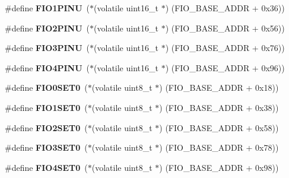 \begin{DoxyCompactItemize}
\#define {\bfseries F\+I\+O1\+P\+I\+NU}~($\ast$(volatile uint16\+\_\+t $\ast$) (F\+I\+O\+\_\+\+B\+A\+S\+E\+\_\+\+A\+D\+DR + 0x36))
\item 
\mbox{\label{group__lpc24xx__regs_ga17b04e8eb448c0cbe2640ce4be2178e2}} 
\#define {\bfseries F\+I\+O2\+P\+I\+NU}~($\ast$(volatile uint16\+\_\+t $\ast$) (F\+I\+O\+\_\+\+B\+A\+S\+E\+\_\+\+A\+D\+DR + 0x56))
\item 
\mbox{\label{group__lpc24xx__regs_ga3285eb90bb2c9c421ef5ced4ec9d0b8c}} 
\#define {\bfseries F\+I\+O3\+P\+I\+NU}~($\ast$(volatile uint16\+\_\+t $\ast$) (F\+I\+O\+\_\+\+B\+A\+S\+E\+\_\+\+A\+D\+DR + 0x76))
\item 
\mbox{\label{group__lpc24xx__regs_ga74bd3f9fe632ef9509e61872910eef8c}} 
\#define {\bfseries F\+I\+O4\+P\+I\+NU}~($\ast$(volatile uint16\+\_\+t $\ast$) (F\+I\+O\+\_\+\+B\+A\+S\+E\+\_\+\+A\+D\+DR + 0x96))
\item 
\mbox{\label{group__lpc24xx__regs_gabc5a21271607dc1426ccb7235f0ab03a}} 
\#define {\bfseries F\+I\+O0\+S\+E\+T0}~($\ast$(volatile uint8\+\_\+t $\ast$) (F\+I\+O\+\_\+\+B\+A\+S\+E\+\_\+\+A\+D\+DR + 0x18))
\item 
\mbox{\label{group__lpc24xx__regs_ga2269431a4845fe3cb6706c7a5b8e6b0b}} 
\#define {\bfseries F\+I\+O1\+S\+E\+T0}~($\ast$(volatile uint8\+\_\+t $\ast$) (F\+I\+O\+\_\+\+B\+A\+S\+E\+\_\+\+A\+D\+DR + 0x38))
\item 
\mbox{\label{group__lpc24xx__regs_ga482b39dd84e6efeb9feda4b2cbee04ef}} 
\#define {\bfseries F\+I\+O2\+S\+E\+T0}~($\ast$(volatile uint8\+\_\+t $\ast$) (F\+I\+O\+\_\+\+B\+A\+S\+E\+\_\+\+A\+D\+DR + 0x58))
\item 
\mbox{\label{group__lpc24xx__regs_gae82aff10fb020c5d4038a538837bb254}} 
\#define {\bfseries F\+I\+O3\+S\+E\+T0}~($\ast$(volatile uint8\+\_\+t $\ast$) (F\+I\+O\+\_\+\+B\+A\+S\+E\+\_\+\+A\+D\+DR + 0x78))
\item 
\mbox{\label{group__lpc24xx__regs_ga95ff75140197f58af3d150612c5cff4f}} 
\#define {\bfseries F\+I\+O4\+S\+E\+T0}~($\ast$(volatile uint8\+\_\+t $\ast$) (F\+I\+O\+\_\+\+B\+A\+S\+E\+\_\+\+A\+D\+DR + 0x98))

\end{DoxyCompactItemize}
